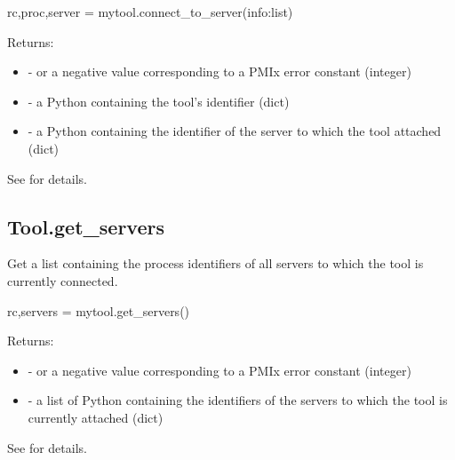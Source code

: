 \pyspecificstart
\begin{codepar}
rc,proc,server = mytool.connect_to_server(info:list)
\end{codepar}
\pyspecificend


\begin{arglist}
\end{arglist}

Returns:

\begin{itemize}
    \item {} -  or a negative value corresponding to a PMIx error constant (integer)
    \item {} - a Python  containing the tool's identifier (dict)
    \item {} - a Python  containing the identifier of the server to which the tool attached (dict)
\end{itemize}

See  for details.


\subsection{Tool.get_servers}

\summary
Get a list containing the  process identifiers of all servers to which the tool is currently connected.


\format

\pyspecificstart
\begin{codepar}
rc,servers = mytool.get_servers()
\end{codepar}
\pyspecificend

Returns:

\begin{itemize}
    \item {} -  or a negative value corresponding to a PMIx error constant (integer)
    \item {} - a list of Python  containing the identifiers of the servers to which the tool is currently attached (dict)
\end{itemize}

See  for details.


